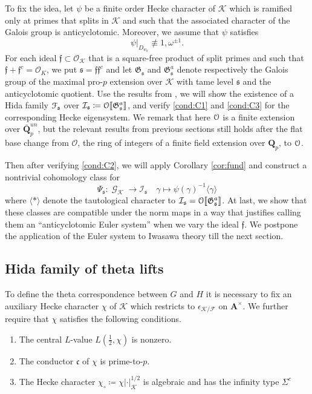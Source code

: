 \documentclass[leqno]{amsart}
\theoremstyle{definition}
\theoremstyle{remark}
\newcommand{\oo}{\mathcal{O}}
\newcommand{\eo}{\EuScript{O}}
\newcommand{\Q}{{\mathbf{Q}}}
\newcommand{\Qp}{\mathbf{Q}_p}
\newcommand{\A}{\mathbf A}
\DeclareMathOperator{\Gal}{\mathcal{G}}
\newcommand{\fc}{\mathfrak{c}}
\newcommand{\ff}{\mathfrak{f}}
\newcommand{\fs}{\mathfrak{s}}
\newcommand{\F}{{\mathcal{F}}} %
\newcommand{\K}{{\mathcal{K}}} %
\newcommand{\qch}{\epsilon} %
\newcommand{\fG}{\mathfrak{G}}
\newcommand{\euF}{\EuScript{F}} %
\newcommand{\I}{\mathcal{I}} %
\begin{document}
To fix the idea, let $\psi$ be a finite order Hecke character
of $\K$ which is ramified only at primes that splits in $\K$ and
such that the associated character of the Galois group
is anticyclotomic.
Moreover, we assume that $\psi$ satisfies
\begin{equation}\label{cond:gen_psi}\tag{$\psi$-gen}
    \psi\vert_{D_{w_0}}\not\equiv 1,\omega^{\pm1}.
\end{equation}
For each ideal $\ff\subset \oo_\K$
that is a square-free product of split primes
and such that $\ff+\ff^c=\oo_K$,
we put $\fs=\ff\ff^c$ and
let $\fG_{\fs}$ and $\fG_\fs^a$ denote respectively
the Galois group of the maximal pro-$p$ extension over $\K$
with tame level $\fs$ and the anticyclotomic quotient.
Use the results from \cite{lee},
we will show the existence of a Hida family
$\euF_\fs$ over 
$\I_\fs\coloneqq \eo\llbracket\fG_\fs^a\rrbracket$,
and verify \ref{cond:C1} and \ref{cond:C3}
for the corresponding Hecke eigensystem.
We remark that here $\eo$ is a finite extension
over $\bar{\Q}_p^{un}$,
but the relevant results from previous sections still holds 
after the flat base change from $\oo$,
the ring of integers of a finite field extension over $\Qp$,
to $\eo$.

Then after verifying \ref{cond:C2},
we will apply Corollary \ref{cor:fund}
and construct a nontrivial cohomology class for 
\[
    \Psi_\fs\colon\Gal_\K\to \I_\fs\quad
    \gamma\mapsto \psi(\gamma)^{-1}\langle \gamma\rangle
\]
where $\langle*\rangle$ denote the tautological character
to $\I_\fs=\eo\llbracket\fG_\fs^a\rrbracket$.
At last, we show that these classes are compatible under the norm maps 
in a way that justifies calling them
an ``anticyclotomic Euler system''
when we vary the ideal $\ff$.
We postpone the application of the Euler system
to Iwasawa theory till the next section.


\subsection{Hida family of theta lifts}


To define the theta correspondence between $G$ and $H$
it is necessary to fix an auxiliary Hecke character
$\chi$ of $\K$ which restricts to 
$\qch_{\K/\F}$ on $\A^\times$.
We further require that $\chi$ satisfies the following conditions.
\begin{enumerate}[label={($\chi$\arabic*)}]
    \item \label{cond:chi1}
    The central $L$-value $L(\frac{1}{2},\chi)$ is nonzero.
    \item \label{cond:chi2}
    The conductor $\fc$ of $\chi$ is prime-to-$p$.
    \item \label{cond:chi3}
    The Hecke character 
    $\chi_\circ\coloneqq \chi|\cdot|_\K^{1/2}$ is algebraic and
    has the infinity type $\Sigma^c$
\end{enumerate}
\end{document}
